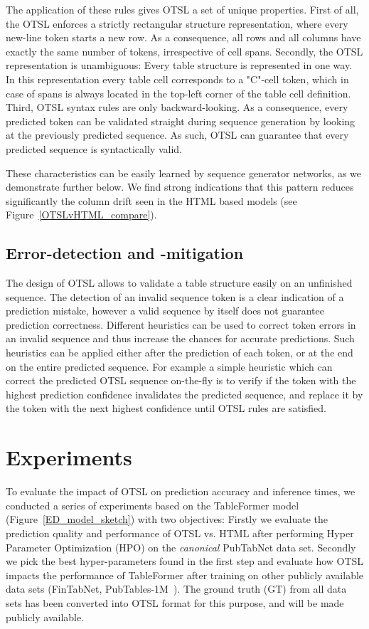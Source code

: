 \documentclass[runningheads]{llncs}
\begin{document}
The application of these rules gives OTSL a set of unique properties.
First of all, the OTSL enforces a strictly rectangular structure representation, where every new-line token starts a new row. As a consequence, all rows and all columns have exactly the same number of tokens, irrespective of cell spans.
Secondly, the OTSL representation is unambiguous: Every table structure is represented in one way. In this representation every table cell corresponds to a "C"-cell token, which in case of spans is always located in the top-left corner of the table cell definition.
Third, OTSL syntax rules are only backward-looking. As a consequence, every predicted token can be validated straight during sequence generation by looking at the previously predicted sequence. As such, OTSL can guarantee that every predicted sequence is syntactically valid. 

These characteristics can be easily learned by sequence generator networks, as we demonstrate further below. We find strong indications that this pattern reduces significantly the column drift seen in the HTML based models (see Figure~\ref{OTSLvHTML_compare}).

\subsection{Error-detection and -mitigation}

The design of OTSL allows to validate a table structure easily on an unfinished sequence. The detection of an invalid sequence token is a clear indication of a prediction mistake, however a valid sequence by itself does not guarantee prediction correctness. Different heuristics can be used to correct token errors in an invalid sequence and thus increase the chances for accurate predictions. Such heuristics can be applied either after the prediction of each token, or at the end on the entire predicted sequence.
For example a simple heuristic which can correct the predicted OTSL sequence on-the-fly is to verify if the token with the highest prediction confidence invalidates the predicted sequence, and replace it by the token with the next highest confidence until OTSL rules are satisfied. 

\section{\label{Results}Experiments}

To evaluate the impact of OTSL on prediction accuracy and inference times, we conducted a series of experiments based on the TableFormer model (Figure~\ref{ED_model_sketch}) with two objectives: Firstly we evaluate the prediction quality and performance of OTSL vs. HTML after performing Hyper Parameter Optimization (HPO) on the \textit{canonical} PubTabNet data set. Secondly we pick the best hyper-parameters found in the first step and evaluate how OTSL impacts the performance of TableFormer after training on other publicly available data sets (FinTabNet, PubTables-1M~\cite{smock2022pubtables}). The ground truth (GT) from all data sets has been converted into OTSL format for this purpose, and will be made publicly available.
\end{document}
